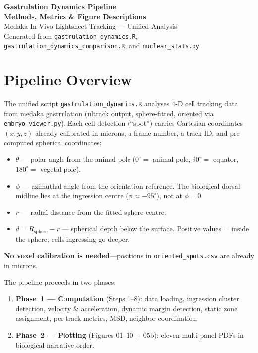 \documentclass[11pt,a4paper]{article}
\begin{document}
\begin{center}
  {\LARGE\bfseries Gastrulation Dynamics Pipeline\\[4pt]
   Methods, Metrics \& Figure Descriptions}\\[12pt]
  {\large Medaka In-Vivo Lightsheet Tracking --- Unified Analysis}\\[8pt]
  {\normalsize Generated from \texttt{gastrulation\_dynamics.R},\\
   \texttt{gastrulation\_dynamics\_comparison.R}, and
   \texttt{nuclear\_stats.py}}
\end{center}

\vspace{1em}

\tableofcontents
\newpage

\section*{Pipeline Overview}

The unified script \texttt{gastrulation\_dynamics.R} analyses 4-D cell
tracking data from medaka gastrulation (ultrack output, sphere-fitted,
oriented via \texttt{embryo\_viewer.py}).  Each cell detection (``spot'')
carries Cartesian coordinates $(x,y,z)$ already calibrated in microns, a
frame number, a track ID, and pre-computed spherical coordinates:
\begin{itemize}[nosep]
  \item $\theta$ --- polar angle from the animal pole ($0^\circ =$ animal
        pole, $90^\circ =$ equator, $180^\circ =$ vegetal pole).
  \item $\phi$ --- azimuthal angle from the orientation reference.  The
        biological dorsal midline lies at the ingression centre
        ($\phi \approx -95^\circ$), not at $\phi=0$.
  \item $r$ --- radial distance from the fitted sphere centre.
  \item $d = R_\mathrm{sphere} - r$ --- spherical depth below the surface.
        Positive values = inside the sphere; cells ingressing go deeper.
\end{itemize}

\noindent\textbf{No voxel calibration is needed}---positions in
\texttt{oriented\_spots.csv} are already in microns.

The pipeline proceeds in two phases:
\begin{enumerate}[nosep]
  \item \textbf{Phase~1 --- Computation} (Steps 1--8): data loading,
        ingression cluster detection, velocity \& acceleration, dynamic
        margin detection, static zone assignment, per-track metrics,
        MSD, neighbor coordination.
  \item \textbf{Phase~2 --- Plotting} (Figures 01--10 + 05b): eleven
        multi-panel PDFs in biological narrative order.
\end{enumerate}
\end{document}
